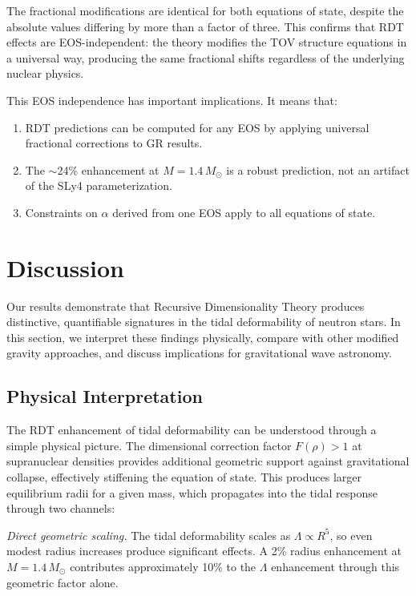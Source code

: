 \documentclass[twocolumn,showpacs,preprintnumbers,amsmath,amssymb,prd]{revtex4-2}
\begin{document}
The fractional modifications are identical for both equations of state, despite the absolute values differing by more than a factor of three. This confirms that RDT effects are EOS-independent: the theory modifies the TOV structure equations in a universal way, producing the same fractional shifts regardless of the underlying nuclear physics.

This EOS independence has important implications. It means that:
\begin{enumerate}
\item RDT predictions can be computed for any EOS by applying universal fractional corrections to GR results.
\item The $\sim$24\% enhancement at $M = 1.4\,M_\odot$ is a robust prediction, not an artifact of the SLy4 parameterization.
\item Constraints on $\alpha$ derived from one EOS apply to all equations of state.
\end{enumerate}


\section{Discussion}
\label{sec:discussion}

Our results demonstrate that Recursive Dimensionality Theory produces distinctive, quantifiable signatures in the tidal deformability of neutron stars. In this section, we interpret these findings physically, compare with other modified gravity approaches, and discuss implications for gravitational wave astronomy.

\subsection{Physical Interpretation}
\label{sec:discussion_physical}

The RDT enhancement of tidal deformability can be understood through a simple physical picture. The dimensional correction factor $F(\rho) > 1$ at supranuclear densities provides additional geometric support against gravitational collapse, effectively stiffening the equation of state. This produces larger equilibrium radii for a given mass, which propagates into the tidal response through two channels:

\textit{Direct geometric scaling.} The tidal deformability scales as $\Lambda \propto R^5$, so even modest radius increases produce significant effects. A 2\% radius enhancement at $M = 1.4\,M_\odot$ contributes approximately 10\% to the $\Lambda$ enhancement through this geometric factor alone.
\end{document}
